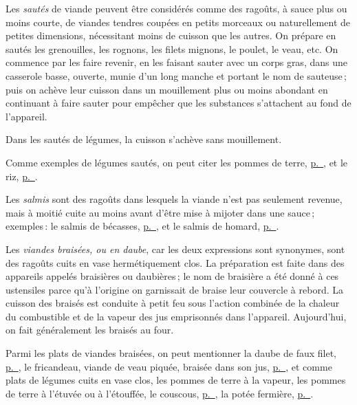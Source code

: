 Les \textit{sautés} de viande peuvent être considérés comme des ragoûts,
à sauce plus ou moins courte, de viandes tendres coupées en petits morceaux ou
naturellement de petites dimensions, nécessitant moins de cuisson que les
autres. On prépare en sautés les grenouilles, les rognons, les filets mignons,
le poulet, le veau, etc. On commence par les faire revenir, en les faisant
sauter avec un corps gras, dans une casserole basse, ouverte, munie d'un long
manche et portant le nom de sauteuse ; puis on achève leur cuisson dans un
mouillement plus ou moins abondant en continuant à faire sauter pour empêcher
que les substances s'attachent au fond de l'appareil.

Dans les sautés de légumes, la cuisson s'achève sans mouillement.

Comme exemples de légumes sautés, on peut citer les pommes de terre,
\hyperlink{p0717}{p. \pageref{pg0717}}, et le riz,
\hyperlink{p0710}{p. \pageref{pg0710}}.

 Les \textit{salmis} sont des ragoûts dans
lesquels la viande n'est pas seulement revenue, mais à moitié cuite au moins
avant d'être mise à mijoter dans une sauce ; exemples : le
salmis de bécasses, \hyperlink{p0630}{p. \pageref{pg0630}}, et le
salmis de homard, \hyperlink{p0284}{p. \pageref{pg0284}}.

Les \textit{viandes braisées, ou en daube}, car les deux expressions sont
synonymes, sont des ragoûts cuits en vase hermétiquement clos. La préparation
est faite dans des appareils appelés braisières ou daubières ; le nom de
braisière a été donné à ces ustensiles parce qu'à l’origine on garnissait de
braise leur couvercle à rebord. La cuisson des braisés est conduite à petit feu
sous l’action combinée de la chaleur du combustible et de la vapeur des jus
emprisonnés dans l'appareil. Aujourd'hui, on fait généralement les braisés au
four.


Parmi les plats de viandes braisées, on peut mentionner la daube de faux filet,
\hyperlink{p0464-2}{p. \pageref{pg0464-2}}, le fricandeau, viande de veau piquée,
braisée dans son jus, \hyperlink{p0499}{p. \pageref{pg0499}}, et comme plats de
légumes cuits en vase clos, les pommes de terre à la vapeur, les pommes de
terre à l’étuvée ou à l'étouffée, le couscous,
\hyperlink{p0704}{p. \pageref{pg0704}}, la potée fermière,
\hyperlink{p0772}{p. \pageref{pg0772}}.


